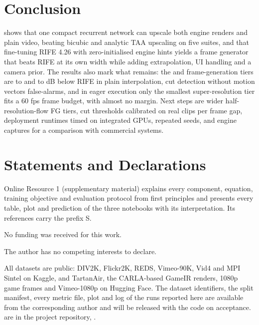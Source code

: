 \documentclass[pdflatex,sn-mathphys-num,iicol]{sn-jnl}
\begin{document}
\section{Conclusion}\label{sec:conclusion}

\Sys{} shows that one compact recurrent network can upscale both engine renders and plain video, beating bicubic and analytic TAA upscaling on five suites, and that fine-tuning RIFE 4.26 with zero-initialised engine hints yields a frame generator that beats RIFE at its own width while adding extrapolation, UI handling and a camera prior. The results also mark what remains: the  and  frame-generation tiers are  to  and  to  dB below RIFE in plain interpolation, cut detection without motion vectors false-alarms, and in eager execution only the smallest super-resolution tier fits a 60 fps frame budget, with almost no margin. Next steps are wider half-resolution-flow FG tiers, cut thresholds calibrated on real clips per frame gap, deployment runtimes timed on integrated GPUs, repeated seeds, and engine captures for a comparison with commercial systems.

\backmatter

\section*{Statements and Declarations}\label{sec:declarations}

 Online Resource 1 (supplementary material) explains every component, equation, training objective and evaluation protocol from first principles and presents every table, plot and prediction of the three notebooks with its interpretation. Its references carry the prefix S.

 No funding was received for this work.

 The author has no competing interests to declare.

 All datasets are public: DIV2K, Flickr2K, REDS, Vimeo-90K, Vid4 and MPI Sintel on Kaggle, and TartanAir, the CARLA-based GameIR renders, 1080p game frames and Vimeo-1080p on Hugging Face. The dataset identifiers, the split manifest, every metric file, plot and log of the runs reported here\ifdefined\Anonymised{} are available from the corresponding author and will be released with the code on acceptance.\else{} are in the project repository, \RepoURL.\fi
\end{document}
